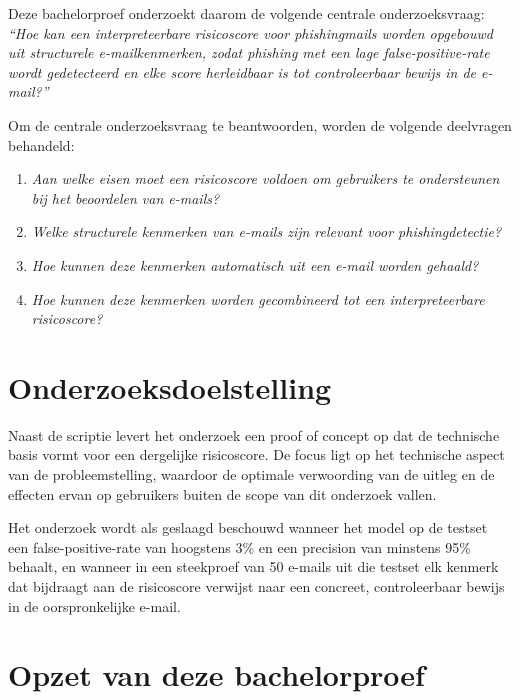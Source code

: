 Deze bachelorproef onderzoekt daarom de volgende centrale onderzoeksvraag: \emph{``Hoe kan een interpreteerbare risicoscore voor phishingmails worden opgebouwd uit structurele e-mail\-ken\-mer\-ken, zodat phishing met een lage false-positive-rate wordt gedetecteerd en elke score herleidbaar is tot controleerbaar bewijs in de e-mail?''}

Om de centrale onderzoeksvraag te beantwoorden, worden de volgende deelvragen behandeld:

\begin{enumerate}
  \item \emph{Aan welke eisen moet een risicoscore voldoen om gebruikers te ondersteunen bij het beoordelen van e-mails?}
  \item \emph{Welke structurele kenmerken van e-mails zijn relevant voor phishingdetectie?}
  \item \emph{Hoe kunnen deze kenmerken automatisch uit een e-mail worden gehaald?}
  \item \emph{Hoe kunnen deze kenmerken worden gecombineerd tot een interpreteerbare risicoscore?}
\end{enumerate}

\section{Onderzoeksdoelstelling}
\label{sec:onderzoeksdoelstelling}

Naast de scriptie levert het onderzoek een proof of concept op dat de technische basis vormt voor een dergelijke risicoscore. De focus ligt op het technische aspect van de probleemstelling, waardoor de optimale verwoording van de uitleg en de effecten ervan op gebruikers buiten de scope van dit onderzoek vallen.

Het onderzoek wordt als geslaagd beschouwd wanneer het model op de testset een false-positive-rate van hoogstens 3\% en een precision van minstens 95\% behaalt, en wanneer in een steekproef van 50 e-mails uit die testset elk kenmerk dat bijdraagt aan de risicoscore verwijst naar een concreet, controleerbaar bewijs in de oorspronkelijke e-mail.

\section{Opzet van deze bachelorproef}
\label{sec:opzet-bachelorproef}



